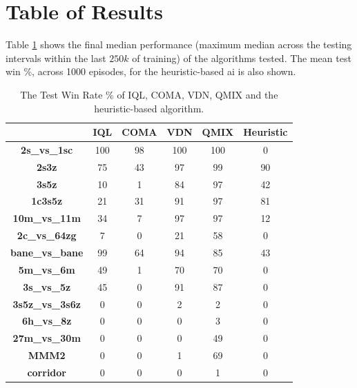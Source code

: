 \section{Table of Results}
\label{sec:table_results}

Table \ref{tab:hai} shows the final median performance (maximum median across the testing intervals within the last $250k$ of training) of the algorithms tested.
The mean test win \%, across 1000 episodes, for the heuristic-based ai is also shown.
\begin{table}[h]
    \setlength{\extrarowheight}{3pt}
        \caption{The Test Win Rate \% of IQL, COMA, VDN, QMIX and the heuristic-based algorithm.}
    \centering
    \begin{center}
        \begin{tabular}{| c | c | c | c | c | c |}
        \hline
        ~&\textbf{IQL}&\textbf{COMA}&\textbf{VDN}&\textbf{QMIX}&\textbf{Heuristic}\\
        \hline \hline
\textbf{2s\_vs\_1sc} &
100&
 98&
100&
100&
0\\
\hline

\textbf{2s3z} &
 75&
 43&
 97&
 99&
90\\
\hline

\textbf{3s5z} &
 10&
  1&
 84&
 97&
42\\
\hline

\textbf{1c3s5z} &
 21&
 31&
 91&
 97&
81\\
\hline

\textbf{10m\_vs\_11m} &
 34&
  7&
 97&
 97&
12\\
\hline
\hline

\textbf{2c\_vs\_64zg} &
  7&
  0&
 21&
 58&
0\\
\hline

\textbf{bane\_vs\_bane} &
 99&
 64&
 94&
 85&
43\\
\hline

\textbf{5m\_vs\_6m} &
 49&
  1&
 70&
 70&
0\\
\hline

\textbf{3s\_vs\_5z} &
 45&
  0&
 91&
 87&
0\\
\hline
\hline

\textbf{3s5z\_vs\_3s6z} &
  0&
  0&
  2&
  2&
0\\
\hline

\textbf{6h\_vs\_8z} &
  0&
  0&
  0&
  3&
0\\
\hline

\textbf{27m\_vs\_30m} &
  0&
  0&
  0&
 49&
0\\
\hline

\textbf{MMM2} &
  0&
  0&
  1&
 69&
0\\
\hline

\textbf{corridor} &
  0&
  0&
  0&
  1&
0\\
\hline
        \end{tabular}
    \end{center}
    \label{tab:hai}
\end{table}
